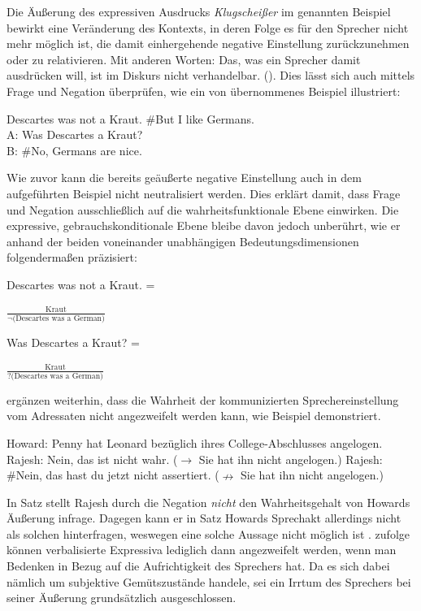 Die Äußerung des expressiven Ausdrucks \textit{Klugscheißer} im genannten Beispiel bewirkt eine Veränderung des Kontexts, in deren Folge es für den Sprecher nicht mehr möglich ist, die damit einhergehende negative Einstellung {zurückzunehmen} oder zu relativieren. Mit anderen Worten: \glqq{}Das, was ein Sprecher damit ausdrücken will, ist im Diskurs nicht verhandelbar.\grqq{} (\citealt[12]{dAvis.2019b}). Dies lässt sich auch mittels Frage und Negation überprüfen, wie ein von \citet[31]{Gutzmann.2015a} übernommenes Beispiel illustriert:

\ea   Descartes was not a Kraut. \#But I like Germans. \label{gutzi} \\
	A: Was Descartes a Kraut? \\
    B: \#No, Germans are nice.
\z

Wie zuvor kann die bereits geäußerte negative Einstellung auch in dem  aufgeführten Beispiel nicht neutralisiert werden. Dies erklärt {\citet[31]{Gutzmann.2015a}} damit, dass Frage und Negation ausschließlich auf die wahrheitsfunktionale Ebene einwirken. Die expressive, gebrauchskonditionale Ebene bleibe davon jedoch unberührt, wie er anhand der beiden voneinander unabhängigen Bedeutungsdimensionen folgendermaßen präzisiert: \medskip

Descartes was not a Kraut. = \begin{large} $\frac{\text{Kraut}}{\text{$\neg$(Descartes was a German)}}$ \end{large} \medskip

Was Descartes a Kraut? = \begin{large} $\frac{\text{Kraut}}{\text{?(Descartes was a German)}}$ \end{large} \medskip

\noindent \citet[12]{dAvis.2019b} ergänzen weiterhin, dass die Wahrheit der kommunizierten Sprechereinstellung vom Adressaten nicht angezweifelt werden kann, wie Beispiel  demonstriert.

\ea  \label{pups}
\ea Howard: \glqq{}Penny hat Leonard bezüglich ihres College-Abschlusses angelogen.\grqq{} \label{penny}
\ex	Rajesh: \glqq{}Nein, das ist nicht wahr.\grqq{} ($\rightarrow$ Sie hat ihn nicht angelogen.) \label{penny1}
\ex Rajesh: \glqq{}\#Nein, das hast du jetzt nicht assertiert.\grqq{} ($\nrightarrow$ Sie hat ihn nicht angelogen.)\label{penny2}
 \z
 \z

In Satz  stellt Rajesh durch die Negation \textit{nicht} den Wahrheitsgehalt von Howards Äußerung infrage. Dagegen kann er in Satz  Howards Sprechakt allerdings nicht als solchen hinterfragen, weswegen eine solche Aussage nicht möglich ist \citep[vgl.][12]{dAvis.2019b}. {\citet[152]{Zifonun.1997}} zufolge können verbalisierte Expressiva lediglich dann angezweifelt werden, wenn man Bedenken in Bezug auf die Aufrichtigkeit des Sprechers hat. Da es sich dabei nämlich um subjektive Gemütszustände handele, sei ein Irrtum des Sprechers bei seiner Äußerung grundsätzlich ausgeschlossen.

